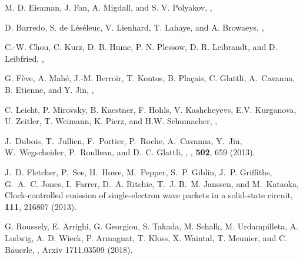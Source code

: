 \documentclass[aps,prb,superscriptaddress,preprint]{revtex4-1}
\begin{document}
	
	\begin{thebibliography}{1}
		
		M. D. Eisaman, J. Fan, A. Migdall, and S. V. Polyakov, , 
		
		D. Barredo, S. de L{\'e}s{\'e}leuc, V. Lienhard, T. Lahaye, and A. Browaeys, ,
		
		C.-W. Chou, C. Kurz, D. B. Hume, P. N. Plessow, D. R. Leibrandt, and  D. Leibfried, , 
		
		G. F{\`e}ve, A. Mah{\'e}, J.-M. Berroir, T. Kontos, B.
		Pla\c{c}ais, C. Glattli, A.~Cavanna, B. Etienne, and Y. Jin,
		,
		
		C. Leicht, P. Mirovsky, B. Kaestner, F. Hohls, V. Kashcheyevs, E.V. Kurganova, U. Zeitler, T. Weimann, K. Pierz, and H.W. Schumacher,
		,
		
		J.~Dubois, T.~Jullien, F.~Portier, P.~Roche, A.~Cavanna, Y.~Jin, W.~Wegscheider,
		P.~Roulleau, and D.~C. Glattli,
		,
		, {\bf 502}, 659 (2013).
		
		J.~D. Fletcher, P.~See, H.~Howe, M.~Pepper, S.~P. Giblin, J.~P. Griffiths,
		G.~A.~C. Jones, I.~Farrer, D.~A. Ritchie, T.~J. B.~M. Janssen, and
		M.~Kataoka,
		\newblock Clock-controlled emission of single-electron wave packets in a
		solid-state circuit,
		 {\bf 111}, 216807 (2013).
		
		G. Roussely, E. Arrighi, G. Georgiou, S. Takada, M. Schalk, M. Urdampilleta, A. Ludwig, A. D. Wieck, P. Armagnat, T. Kloss, X. Waintal, T. Meunier, and C. B\"{a}uerle,
		, Arxiv 1711.03509 (2018).
		

\end{thebibliography}
\end{document}
